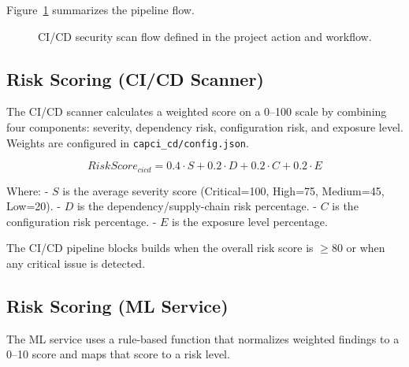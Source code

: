 \documentclass[conference]{IEEEtran}
\begin{document}
Figure~\ref{fig:flow} summarizes the pipeline flow.

\begin{figure}[htbp]
\centering
{}
\caption{CI/CD security scan flow defined in the project action and workflow.}
\label{fig:flow}
\end{figure}

\subsection{Risk Scoring (CI/CD Scanner)}
The CI/CD scanner calculates a weighted score on a 0--100 scale by combining four components: severity, dependency risk, configuration risk, and exposure level. Weights are configured in \texttt{capci\_cd/config.json}.

\begin{equation}
RiskScore_{cicd} = 0.4\cdot S + 0.2\cdot D + 0.2\cdot C + 0.2\cdot E
\end{equation}

Where:
- $S$ is the average severity score (Critical=100, High=75, Medium=45, Low=20).
- $D$ is the dependency/supply-chain risk percentage.
- $C$ is the configuration risk percentage.
- $E$ is the exposure level percentage.

The CI/CD pipeline blocks builds when the overall risk score is $\geq 80$ or when any critical issue is detected.

\subsection{Risk Scoring (ML Service)}
The ML service uses a rule‑based function that normalizes weighted findings to a 0--10 score and maps that score to a risk level.
\end{document}

